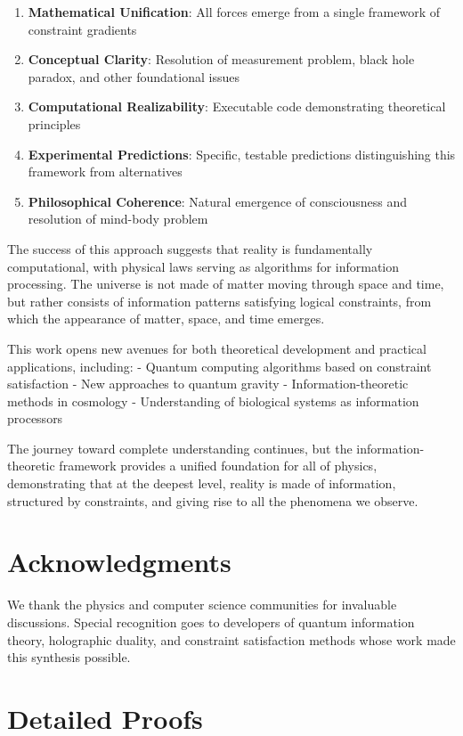 \documentclass[12pt,a4paper]{article}
\begin{document}
\begin{enumerate}
\item \textbf{Mathematical Unification}: All forces emerge from a single framework of constraint gradients
\item \textbf{Conceptual Clarity}: Resolution of measurement problem, black hole paradox, and other foundational issues
\item \textbf{Computational Realizability}: Executable code demonstrating theoretical principles
\item \textbf{Experimental Predictions}: Specific, testable predictions distinguishing this framework from alternatives
\item \textbf{Philosophical Coherence}: Natural emergence of consciousness and resolution of mind-body problem
\end{enumerate}

The success of this approach suggests that reality is fundamentally computational, with physical laws serving as algorithms for information processing. The universe is not made of matter moving through space and time, but rather consists of information patterns satisfying logical constraints, from which the appearance of matter, space, and time emerges.

This work opens new avenues for both theoretical development and practical applications, including:
- Quantum computing algorithms based on constraint satisfaction
- New approaches to quantum gravity
- Information-theoretic methods in cosmology
- Understanding of biological systems as information processors

The journey toward complete understanding continues, but the information-theoretic framework provides a unified foundation for all of physics, demonstrating that at the deepest level, reality is made of information, structured by constraints, and giving rise to all the phenomena we observe.

\section*{Acknowledgments}

We thank the physics and computer science communities for invaluable discussions. Special recognition goes to developers of quantum information theory, holographic duality, and constraint satisfaction methods whose work made this synthesis possible.

\appendix

\section{Detailed Proofs}
\end{document}
